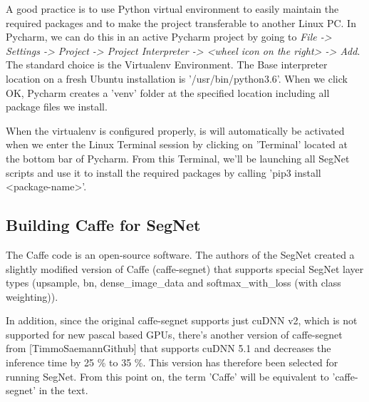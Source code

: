 A good practice is to use Python virtual environment to easily maintain the required packages and to make the project transferable to another Linux PC. In Pycharm, we can do this in an active Pycharm project by going to \textit{File -> Settings -> Project -> Project Interpreter -> <wheel icon on the right> -> Add}. The standard choice is the Virtualenv Environment. The Base interpreter location on a fresh Ubuntu installation is '/usr/bin/python3.6'. When we click OK, Pycharm creates a 'venv' folder at the specified location including all package files we install.

When the virtualenv is configured properly, is will automatically be activated when we enter the Linux Terminal session by clicking on 'Terminal' located at the bottom bar of Pycharm. From this Terminal, we'll be launching all SegNet scripts and use it to install the required packages by calling 'pip3 install <package-name>'.

\subsection{Building Caffe for SegNet} 

The Caffe code is an open-source software. The authors of the SegNet created a slightly modified version of Caffe (caffe-segnet) that supports special SegNet layer types (upsample, bn, dense\_image\_data and softmax\_with\_loss (with class weighting)).

In addition, since the original caffe-segnet supports just cuDNN v2, which is not supported for new pascal based GPUs, there's another version of caffe-segnet from [TimmoSaemannGithub] that supports cuDNN 5.1 and decreases the inference time by 25 \% to 35 \%. This version has therefore been selected for running SegNet. From this point on, the term 'Caffe' will be equivalent to 'caffe-segnet' in the text.

